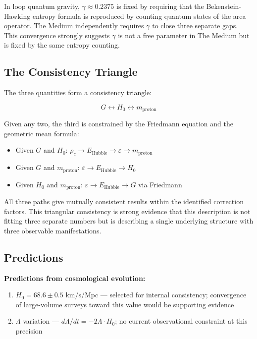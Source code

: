 \documentclass[11pt,letterpaper]{article}
\newenvironment{predbox}{\begin{tcolorbox}[colback=violet!3!white,colframe=violet!50!black,title={\small\textit{Testable prediction}},breakable]}{\end{tcolorbox}}
\begin{document}
In loop quantum gravity, \(\gamma \approx 0.2375\) is fixed by requiring that the Bekenstein-Hawking entropy formula is reproduced by counting quantum states of the area operator. The Medium independently requires \(\gamma\) to close three separate gaps. This convergence strongly suggests \(\gamma\) is not a free parameter in The Medium but is fixed by the same entropy counting.

\subsection{The Consistency Triangle}
\label{sec:orgb0f8e4f}

The three quantities form a consistency triangle:

\begin{equation}
G \longleftrightarrow H_0 \longleftrightarrow m_\text{proton}
\end{equation}

Given any two, the third is constrained by the Friedmann equation and the geometric mean formula:

\begin{itemize}
\item Given \(G\) and \(H_0\): \(\rho_c \to E_\text{Hubble} \to \varepsilon \to m_\text{proton}\)
\item Given \(G\) and \(m_\text{proton}\): \(\varepsilon \to E_\text{Hubble} \to H_0\)
\item Given \(H_0\) and \(m_\text{proton}\): \(\varepsilon \to E_\text{Hubble} \to G\) via Friedmann
\end{itemize}

All three paths give mutually consistent results within the identified correction factors. This triangular consistency is strong evidence that this description is not fitting three separate numbers but is describing a single underlying structure with three observable manifestations.

\subsection{Predictions}
\label{sec:org097beb4}

\begin{predbox}
\textbf{Predictions from cosmological evolution:}
\begin{enumerate}\setlength\itemsep{2pt}
\item $H_0 = 68.6 \pm 0.5$ km/s/Mpc --- selected for internal consistency; convergence of large-volume surveys toward this value would be supporting evidence
\item $\Lambda$ variation --- $d\Lambda/dt = -2\Lambda \cdot H_0$; no current observational constraint at this precision
\end{enumerate}
\end{predbox}
\end{document}
